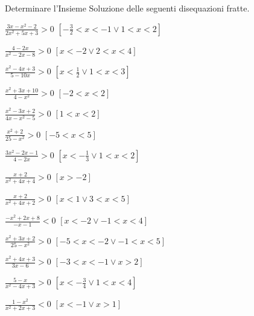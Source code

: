 \begin{esercizio}[\Ast]
 \label{ese:4.61}
Determinare l'Insieme Soluzione delle seguenti disequazioni fratte.
\begin{multicols}{2}
\begin{enumeratea}
\item \(\frac{3x-x^2-2}{2x^2+5x+3}>0\) \hfill \(\left[-\frac 3 2<x<-1\vee 1<x<2\right]\)
\item \(\frac{4-2x}{x^2-2x-8}>0\) \hfill \(\left[x<-2\vee 2<x<4\right]\)
\item \(\frac{x^2-4x+3}{5-10x}>0\) \hfill \(\left[x<\frac 1 2\vee 1<x<3\right]\)
\item \(\frac{x^2+3x+10}{4-x^2}>0\) \hfill \(\left[-2<x<2\right]\)
\item \(\frac{x^2-3x+2}{4x-x^2-5}>0\) \hfill \(\left[1<x<2\right]\)
\item \(\frac{x^2+2}{25-x^2}>0\) \hfill \(\left[-5<x<5\right]\)
\item \(\frac{3x^2-2x-1}{4-2x}>0\) \hfill \(\left[x<-\frac 1 3\vee 1<x<2\right]\)
\item \(\frac{x+2}{x^2+4x+4}>0\) \hfill \(\left[x>-2\right]\)
\item \(\frac{x+2}{x^2+4x+2}>0\) \hfill \(\left[x<1\vee 3<x<5\right]\)
\item \(\frac{-x^2+2x+8}{-x-1}<0\) \hfill \(\left[x<-2\vee -1<x<4\right]\)
\item \(\frac{x^2+3x+2}{25-x^2}>0\) \hfill \(\left[-5<x<-2\vee -1<x<5\right]\)
\item \(\frac{x^2+4x+3}{3x-6}>0\) \hfill \(\left[-3<x<-1\vee x>2\right]\)
\item \(\frac{5-x}{x^2-4x+3}>0\) \hfill \(\left[x<-\frac 3 4\vee 1<x<4\right]\)
\item \(\frac{1-x^2}{x^2+2x+3}<0\) \hfill \(\left[x<-1\vee x>1\right]\)
\end{enumeratea}
\end{multicols}
\end{esercizio}

